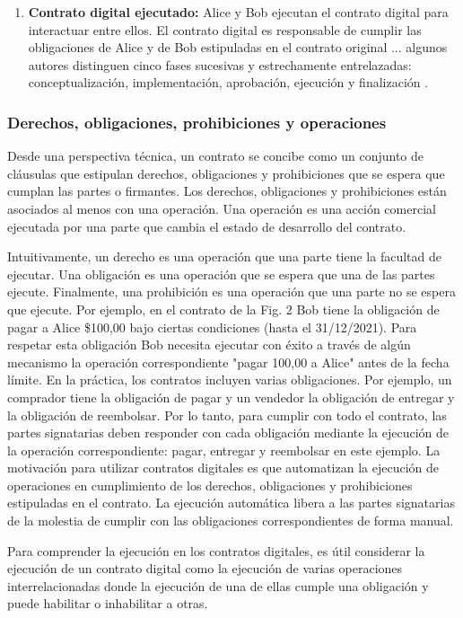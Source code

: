 \documentclass[12pt]{report} %
\begin{document}
\begin{itemize}
\begin{enumerate}
\item \textbf {Contrato digital ejecutado:} Alice y Bob ejecutan el contrato digital para interactuar entre ellos. El contrato digital es responsable de cumplir las obligaciones de Alice y de Bob estipuladas en el contrato original
... algunos autores distinguen cinco fases sucesivas y estrechamente entrelazadas: conceptualización, implementación, aprobación, ejecución y finalización  .


\end{enumerate}

\subsubsection{Derechos, obligaciones, prohibiciones y operaciones}

 Desde una perspectiva técnica, un contrato se concibe como un conjunto de cláusulas que estipulan derechos, obligaciones y prohibiciones que se espera que cumplan las partes o firmantes. Los derechos, obligaciones y prohibiciones están asociados al menos con una operación. Una operación es una acción comercial ejecutada por una parte que cambia el estado de desarrollo del contrato.   

Intuitivamente, un derecho es una operación que una parte tiene la facultad de  ejecutar. Una obligación es una operación que se espera que una de las partes ejecute. Finalmente, una prohibición es una operación que una parte no se espera que ejecute. Por ejemplo, en el contrato de la Fig. 2 Bob tiene la obligación de pagar a Alice \$100,00 bajo ciertas condiciones (hasta el 31/12/2021). Para respetar esta obligación Bob necesita ejecutar con éxito a través de algún mecanismo la operación correspondiente "pagar 100,00 a Alice" antes de la fecha límite. En la práctica, los contratos incluyen varias obligaciones. Por ejemplo, un comprador tiene la obligación de pagar y un vendedor la obligación de entregar y la obligación de reembolsar. Por lo tanto, para cumplir con todo el contrato, las partes signatarias deben responder con cada obligación mediante la ejecución de la operación correspondiente: pagar, entregar y reembolsar en este ejemplo. La motivación para utilizar contratos digitales es que automatizan la ejecución de operaciones en cumplimiento de los derechos, obligaciones y prohibiciones estipuladas en el contrato. La ejecución automática libera a las partes signatarias de la molestia de cumplir con las obligaciones correspondientes de forma manual.

Para comprender la ejecución en los contratos digitales, es útil considerar la ejecución de un contrato digital como la ejecución de varias operaciones interrelacionadas donde la ejecución de una de ellas cumple una obligación y puede habilitar o inhabilitar a otras.


\end{itemize}
\end{document}

